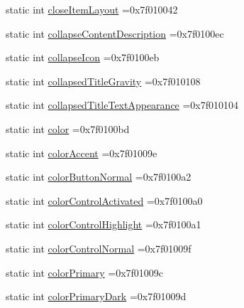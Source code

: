 \begin{DoxyCompactItemize}
\item 
static int \hyperlink{classandroid_1_1support_1_1v7_1_1mediarouter_1_1R_1_1attr_aff5cf12989d6d01a668c3b60293a0e02}{close\+Item\+Layout} =0x7f010042
\item 
static int \hyperlink{classandroid_1_1support_1_1v7_1_1mediarouter_1_1R_1_1attr_a19e837e1a95143b4a69da4c398cb0dfe}{collapse\+Content\+Description} =0x7f0100ec
\item 
static int \hyperlink{classandroid_1_1support_1_1v7_1_1mediarouter_1_1R_1_1attr_a7da4c775773862525355b5217dba4a78}{collapse\+Icon} =0x7f0100eb
\item 
static int \hyperlink{classandroid_1_1support_1_1v7_1_1mediarouter_1_1R_1_1attr_aa7a18ef11d71b28d4906207ff89e82c8}{collapsed\+Title\+Gravity} =0x7f010108
\item 
static int \hyperlink{classandroid_1_1support_1_1v7_1_1mediarouter_1_1R_1_1attr_a2993405c76ed4757e250557ecbdc4943}{collapsed\+Title\+Text\+Appearance} =0x7f010104
\item 
static int \hyperlink{classandroid_1_1support_1_1v7_1_1mediarouter_1_1R_1_1attr_a4bb03a327a2223476d43ef921e0826a6}{color} =0x7f0100bd
\item 
static int \hyperlink{classandroid_1_1support_1_1v7_1_1mediarouter_1_1R_1_1attr_a819d6b80d88b055311583857808c3cad}{color\+Accent} =0x7f01009e
\item 
static int \hyperlink{classandroid_1_1support_1_1v7_1_1mediarouter_1_1R_1_1attr_a850272e1d6fbbcfc7e8ac38e3a828cdc}{color\+Button\+Normal} =0x7f0100a2
\item 
static int \hyperlink{classandroid_1_1support_1_1v7_1_1mediarouter_1_1R_1_1attr_af0b9256d1a94dcf2b3984484a9028082}{color\+Control\+Activated} =0x7f0100a0
\item 
static int \hyperlink{classandroid_1_1support_1_1v7_1_1mediarouter_1_1R_1_1attr_abb07fa9a5eea7ae936cbd535a850d6e4}{color\+Control\+Highlight} =0x7f0100a1
\item 
static int \hyperlink{classandroid_1_1support_1_1v7_1_1mediarouter_1_1R_1_1attr_a509852bd1ac74db181f64f0400343421}{color\+Control\+Normal} =0x7f01009f
\item 
static int \hyperlink{classandroid_1_1support_1_1v7_1_1mediarouter_1_1R_1_1attr_a145bc9b53bbf312ff2935682368395ca}{color\+Primary} =0x7f01009c
\item 
static int \hyperlink{classandroid_1_1support_1_1v7_1_1mediarouter_1_1R_1_1attr_a92d196fe27bb6eef459e41535228b2b7}{color\+Primary\+Dark} =0x7f01009d
\item 

\end{DoxyCompactItemize}

